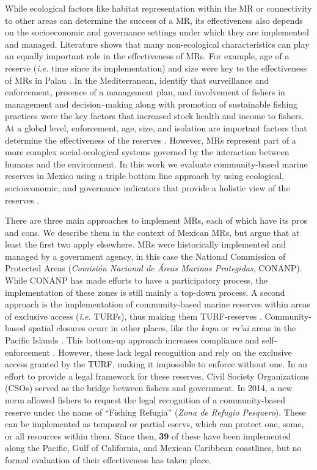 \documentclass{frontiersSCNS}
\theoremstyle{definition}
\theoremstyle{definition}
\theoremstyle{definition}
\theoremstyle{remark}
\begin{document}
While ecological factors like habitat representation within the MR or
connectivity to other areas can determine the success of a MR, its
effectiveness also depends on the socioeconomic and governance settings
under which they are implemented and managed. Literature shows that many
non-ecological characteristics can play an equally important role in the
effectiveness of MRs. For example, age of a reserve (\emph{i.e.} time
since its implementation) and size were key to the effectiveness of MRs
in Palau \citep{friedlander_2017-oI}. In the Mediterranean,
\citet{difranco_2016-Xw} identify that surveillance and enforcement,
presence of a management plan, and involvement of fishers in management
and decision--making along with promotion of sustainable fishing
practices were the key factors that increased stock health and income to
fishers. At a global level, enforcement, age, size, and isolation are
important factors that determine the effectiveness of the reserves
\citep{edgar_2014-UO}. However, MRs represent part of a more complex
social-ecological systems governed by the interaction between humans and
the environment. In this work we evaluate community-based marine
reserves in Mexico using a triple bottom line approach by using
ecological, socioeconomic, and governance indicators that provide a
holistic view of the reserves \citep{halpern_2013}.

There are three main approaches to implement MRs, each of which have its
pros and cons. We describe them in the context of Mexican MRs, but argue
that at least the first two apply elsewhere. MRs were historically
implemented and managed by a government agency, in this case the
National Commission of Protected Areas (\emph{Comisión Nacional de Áreas
Marinas Protegidas}, CONANP). While CONANP has made efforts to have a
participatory process, the implementation of these zones is still mainly
a top-down process. A second approach is the implementation of
community-based marine reserves within areas of exclusive access
(\emph{i.e.} TURFs), thus making them TURF-reserves
\citep{afflerbach_2014-HP}. Community-based spatial closures ocurr in
other places, like the \emph{kapu} or \emph{ra'ui} areas in the Pacific
Islands \citep{bohnsack_2004,johannes_2002}. This bottom-up approach
increases compliance and self-enforcement
\citep{gelcich_2015-Gw,espinosaromero_2014-PY,beger_2004-Y8}. However,
these lack legal recognition and rely on the exclusive access granted by
the TURF, making it impossible to enforce without one. In an effort to
provide a legal framework for these reserves, Civil Society
Organizations (CSOs) served as the bridge between fishers and
government. In 2014, a new norm \citep{nom} allowed fishers to request
the legal recognition of a community-based reserve under the name of
``Fishing Refugia'' (\emph{Zona de Refugio Pesquero}). These can be
implemented as temporal or partial eservs, which can protect one, some,
or all resources within them. Since then, \textbf{39} of these have been
implemented along the Pacific, Gulf of California, and Mexican Caribbean
coastlines, but no formal evaluation of their effectiveness has taken
place.
\end{document}
